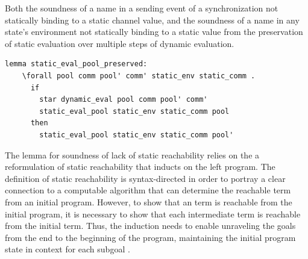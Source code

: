 \documentclass[10pt]{article}
\begin{document}
Both the soundness of a name in a sending event of a synchronization not statically binding
to a static
channel value, and the soundness of a name in any state's environment not statically binding
to a static value from the preservation of static evaluation over multiple steps of dynamic
evaluation.

\begin{lstlisting}[language=logic, mathescape]
  lemma static_eval_pool_preserved:
    \forall pool comm pool' comm' static_env static_comm .
      if
        star dynamic_eval pool comm pool' comm' 
        static_eval_pool static_env static_comm pool
      then
        static_eval_pool static_env static_comm pool'
\end{lstlisting}

The lemma for soundness of lack of static reachability relies on the a reformulation of
static reachability that inducts on the left program.
The definition of static reachability is syntax-directed in
order to portray a clear connection to
a computable algorithm that can determine the reachable term from an initial program.
However, to show that an term is reachable from the initial program, it is necessary to
show that each intermediate term is reachable from the initial term.  Thus, the
induction needs to enable unraveling the goals from the end to the beginning of the program,
maintaining the initial program state in context for each subgoal .
\end{document}
